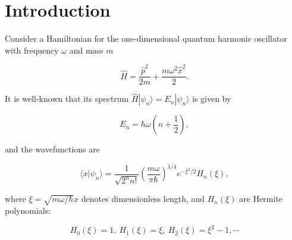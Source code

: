 \section*{Introduction}

Consider a Hamiltonian for the one-dimensional quantum harmonic oscillator with frequency $\omega$ and mass $m$

\begin{equation}
    \hat{H} = \frac{\hat{p}^2}{2m} + \frac{m\omega^2\hat{x}^2}{2}.
\end{equation}

It is well-known that its spectrum $\hat{H}|\psi_n\rangle=E_n|\psi_n\rangle$ is given by

\begin{equation}
    E_n = \hbar\omega\left(n+\frac{1}{2}\right),
\end{equation}

and the wavefunctions are

\begin{equation}
    \langle x|\psi_n \rangle = \frac{1}{\sqrt{2^n n!}}\left(\frac{m\omega}{\pi\hbar}\right)^{1/4}e^{-\xi^2/2}H_n(\xi),
\end{equation}

where $\xi=\sqrt{m\omega/\hbar}x$ denotes dimensionless length, and $H_n(\xi)$ are Hermite polynomials:

\begin{equation}
    H_0(\xi) = 1,\ H_1(\xi) = \xi,\ H_2(\xi) = \xi^2-1,\cdots
\end{equation}
